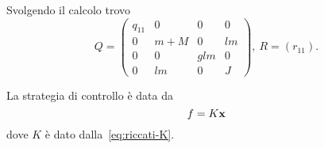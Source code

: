 Svolgendo il calcolo trovo
\begin{equation*}
    Q = \left(
    \begin{array}{cccc}
        q_{11} & 0 & 0 & 0 \\
        0 & m+M & 0 & lm \\
        0 & 0 & glm & 0 \\
        0 & lm & 0 & J
    \end{array}
    \right), \
    R = \left(
    r_{11}
    \right).
\end{equation*}

La strategia di controllo è data da
\begin{equation*}
    f = K\mathbf{x}
\end{equation*}
dove $K$ è dato dalla~\eqref{eq:riccati-K}.